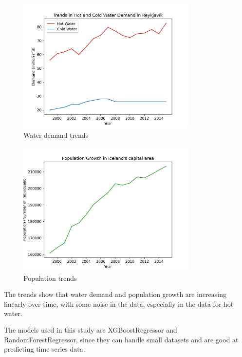 \documentclass{article}
\begin{document}
\begin{figure}[h]
    \centering
    \includegraphics[width=0.8\textwidth]{../figures/trends-in-hot-and-cold-water-demand.png}
    \caption{Water demand trends}
    \label{fig:water-demand-trends}
\end{figure}

\begin{figure}[!h]
    \centering
    \includegraphics[width=0.8\textwidth]{../figures/population-growth.png}
    \caption{Population trends}
    \label{fig:population-trends}
\end{figure}

The trends show that water demand and population growth are increasing linearly over time, with some noise in the data, especially in the data for hot water.

The models used in this study are XGBoostRegressor and RandomForestRegressor, since they can handle small datasets and are good at predicting time series data.

\newpage
\end{document}
